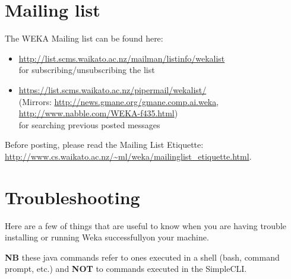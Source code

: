 %
%
%
%


\section{Mailing list}
The WEKA Mailing list can be found here:

\begin{itemize}
\item \url{http://list.scms.waikato.ac.nz/mailman/listinfo/wekalist}{}\\
for subscribing/unsubscribing the list
\item \url{https://list.scms.waikato.ac.nz/pipermail/wekalist/}{}\\
(Mirrors: \url{http://news.gmane.org/gmane.comp.ai.weka}{}, \\ \url{http://www.nabble.com/WEKA-f435.html}{}) \\
for searching previous posted messages
\end{itemize}

\noindent Before posting, please read the Mailing List Etiquette:\\
\url{http://www.cs.waikato.ac.nz/~ml/weka/mailinglist_etiquette.html}{}.



\section{Troubleshooting}
Here are a few of things that are useful to know when you are having
trouble installing or running Weka successfullyon your machine.

\textbf{NB} these java commands refer to ones executed in a shell
(bash, command prompt, etc.) and \textbf{NOT} to commands executed in the
SimpleCLI.

